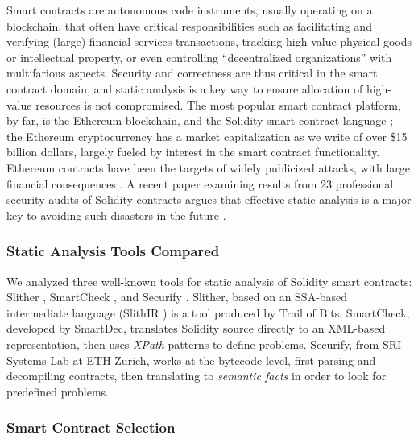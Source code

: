 Smart contracts are autonomous code instruments, usually operating on a blockchain, that often have critical responsibilities such as facilitating and verifying (large) financial services transactions, tracking high-value physical goods or intellectual property, or even controlling ``decentralized organizations'' with multifarious aspects.  Security and correctness are thus critical in the smart contract domain, and static analysis is a key way to ensure allocation of high-value resources is not compromised.  The most popular smart contract platform, by far, is the Ethereum blockchain, and the Solidity smart contract language \cite{buterin2013whitepaper,wood2014yellow}; the Ethereum cryptocurrency has a market capitalization as we write of over \$15 billion dollars, largely fueled by interest in the smart contract functionality.  Ethereum contracts have been the targets of widely publicized attacks, with large financial consequences  \cite{spank,DAO}.   A recent paper examining results from 23 professional security audits of Solidity contracts argues that effective static analysis is a major key to avoiding such disasters in the future \cite{FC20}.

\subsubsection{Static Analysis Tools Compared}

We analyzed three well-known tools for static analysis of Solidity smart contracts: Slither \cite{slither}, SmartCheck \cite{smartcheck}, and Securify \cite{Securify}.  Slither, based on an SSA-based intermediate language (SlithIR \cite{slither}) is a tool produced by Trail of Bits.  SmartCheck, developed by SmartDec, translates Solidity source directly to an XML-based representation, then uses \emph{XPath} patterns to define problems.  Securify, from SRI Systems Lab at ETH Zurich, works at the bytecode level, first parsing and decompiling contracts, then translating to \emph{semantic facts} in order to look for predefined problems.

\subsubsection{Smart Contract Selection}

